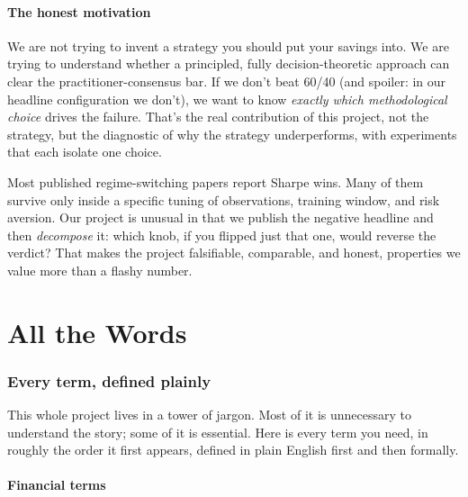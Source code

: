 \documentclass[11pt]{article}
\begin{document}
\subsection{The honest motivation}

We are not trying to invent a strategy you should put your savings into. We are trying to understand whether a principled, fully decision-theoretic approach can clear the practitioner-consensus bar. If we don't beat 60/40 (and spoiler: in our headline configuration we don't), we want to know \emph{exactly which methodological choice} drives the failure. That's the real contribution of this project, not the strategy, but the diagnostic of why the strategy underperforms, with experiments that each isolate one choice.

\begin{plainenglish}
Most published regime-switching papers report Sharpe wins. Many of them survive only inside a specific tuning of observations, training window, and risk aversion. Our project is unusual in that we publish the negative headline and then \emph{decompose} it: which knob, if you flipped just that one, would reverse the verdict? That makes the project falsifiable, comparable, and honest, properties we value more than a flashy number.
\end{plainenglish}

\part{All the Words}

\section{Every term, defined plainly}\label{sec:terms}

This whole project lives in a tower of jargon. Most of it is unnecessary to understand the story; some of it is essential. Here is every term you need, in roughly the order it first appears, defined in plain English first and then formally.

\subsection{Financial terms}
\end{document}
